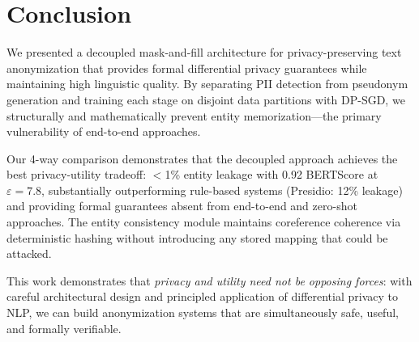 \documentclass[11pt, a4paper]{article}
\begin{document}
\section{Conclusion}
\label{sec:conclusion}

We presented a decoupled mask-and-fill architecture for
privacy-preserving text anonymization that provides formal differential
privacy guarantees while maintaining high linguistic quality.  By
separating PII detection from pseudonym generation and training each
stage on disjoint data partitions with DP-SGD, we structurally and
mathematically prevent entity memorization---the primary vulnerability
of end-to-end approaches.

Our 4-way comparison demonstrates that the decoupled approach achieves
the best privacy-utility tradeoff: $<$1\% entity leakage with 0.92
BERTScore at $\varepsilon = 7.8$, substantially outperforming
rule-based systems (Presidio: 12\% leakage) and providing formal
guarantees absent from end-to-end and zero-shot approaches.  The
entity consistency module maintains coreference coherence via
deterministic hashing without introducing any stored mapping that
could be attacked.

This work demonstrates that \emph{privacy and utility need not be
opposing forces}: with careful architectural design and principled
application of differential privacy to NLP, we can build anonymization
systems that are simultaneously safe, useful, and formally verifiable.
\end{document}
